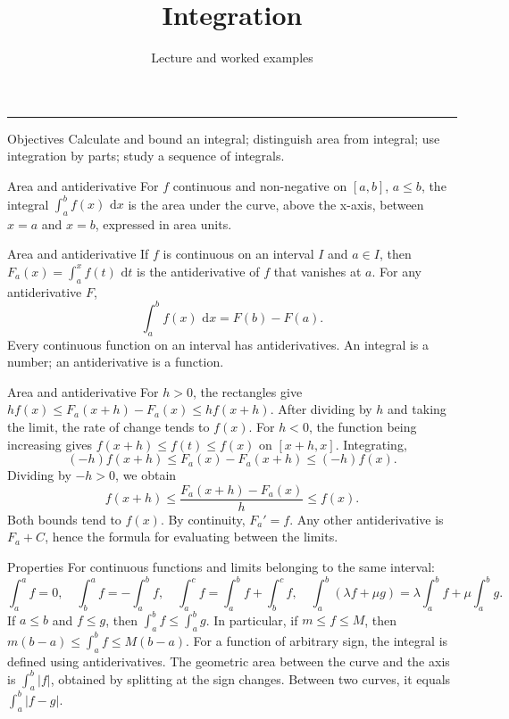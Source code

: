 \documentclass[aspectratio=169,10pt]{beamer}
\title{Integration}
\subtitle{Lecture and worked examples}
\date{}
\author{}
\providecommand{\dd}{\,\mathrm{d}}
\begin{document}
\begin{frame}[plain]
\vfill
{\inserttitle\par}
\medskip
{\insertsubtitle\par}
\medskip
{\rule{\textwidth}{.5pt}}
\vfill
\end{frame}
\begin{frame}{Objectives}
Calculate and bound an integral; distinguish area from integral; use integration by parts; study a sequence of integrals.
\end{frame}
\begin{frame}{Area and antiderivative}
For \(f\) continuous and non-negative on \([a,b]\), \(a\le b\), the integral \(\int_a^b f(x)\,\dd x\) is the area under the curve, above the x-axis, between \(x=a\) and \(x=b\), expressed in area units.
\end{frame}
\begin{frame}{Area and antiderivative}
If \(f\) is continuous on an interval \(I\) and \(a\in I\), then \(F_a(x)=\int_a^x f(t)\,\dd t\) is the antiderivative of \(f\) that vanishes at \(a\). For any antiderivative \(F\),
\[\int_a^b f(x)\,\dd x=F(b)-F(a).\]
Every continuous function on an interval has antiderivatives. An integral is a number; an antiderivative is a function.
\end{frame}
\begin{frame}{Area and antiderivative}
For \(h>0\), the rectangles give \(hf(x)\le F_a(x+h)-F_a(x)\le hf(x+h)\). After dividing by \(h\) and taking the limit, the rate of change tends to \(f(x)\). For \(h<0\), the function being increasing gives \(f(x+h)\le f(t)\le f(x)\) on \([x+h,x]\). Integrating,
\[(-h)f(x+h)\le F_a(x)-F_a(x+h)\le(-h)f(x).\]
Dividing by \(-h>0\), we obtain
\[f(x+h)\le\dfrac{F_a(x+h)-F_a(x)}h\le f(x).\]
Both bounds tend to \(f(x)\). By continuity, \(F_a'=f\). Any other antiderivative is \(F_a+C\), hence the formula for evaluating between the limits.
\end{frame}
\begin{frame}{Properties}
For continuous functions and limits belonging to the same interval:
\[\int_a^a f=0,\quad\int_b^a f=-\int_a^b f,\quad
\int_a^c f=\int_a^b f+\int_b^c f,\quad
\int_a^b(\lambda f+\mu g)=\lambda\int_a^b f+\mu\int_a^b g.\]
If \(a\le b\) and \(f\le g\), then \(\int_a^b f\le\int_a^b g\). In particular, if \(m\le f\le M\), then \(m(b-a)\le\int_a^b f\le M(b-a)\).
For a function of arbitrary sign, the integral is defined using antiderivatives. The geometric area between the curve and the axis is \(\int_a^b|f|\), obtained by splitting at the sign changes. Between two curves, it equals \(\int_a^b|f-g|\).
\end{frame}
\end{document}

